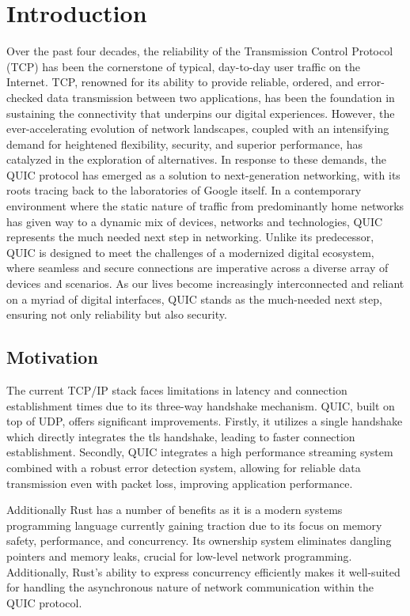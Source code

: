 \chapter{Introduction}

Over the past four decades, the reliability of the Transmission Control Protocol (TCP) has been the cornerstone
of typical, day-to-day user traffic on the Internet. TCP, renowned for its ability to provide reliable, ordered,
and error-checked data transmission between two applications, has been the foundation in sustaining the
connectivity that underpins our digital experiences. However, the ever-accelerating evolution of network
landscapes, coupled with an intensifying demand for heightened flexibility, security, and superior performance,
has catalyzed in the exploration of alternatives. In response to these demands, the QUIC protocol has emerged
as a solution to next-generation networking, with its roots tracing back to the laboratories of Google itself.
In a contemporary environment where the static nature of traffic from predominantly home networks has given way
to a dynamic mix of devices, networks and technologies, QUIC represents the much needed next step in networking.
Unlike its predecessor, QUIC is designed to meet the challenges of a modernized digital ecosystem, where seamless
and secure connections are imperative across a diverse array of devices and scenarios. As our lives become
increasingly interconnected and reliant on a myriad of digital interfaces, QUIC stands as the much-needed next
step, ensuring not only reliability but also security.

\section{Motivation}

The current TCP/IP stack faces limitations in latency and connection establishment times due to its three-way
handshake mechanism. QUIC, built on top of UDP, offers significant improvements.  Firstly, it utilizes a single
handshake which directly integrates the tls handshake, leading to faster connection establishment. Secondly,
QUIC integrates a high performance streaming system combined with a robust error detection system, allowing
for reliable data transmission even with packet loss, improving application performance.

Additionally Rust has a number of benefits as it is a modern systems programming language currently gaining
traction due to its focus on memory safety, performance, and concurrency. Its ownership system eliminates
dangling pointers and memory leaks, crucial for low-level network programming. Additionally, Rust's ability
to express concurrency efficiently makes it well-suited for handling the asynchronous nature of network
communication within the QUIC protocol.

